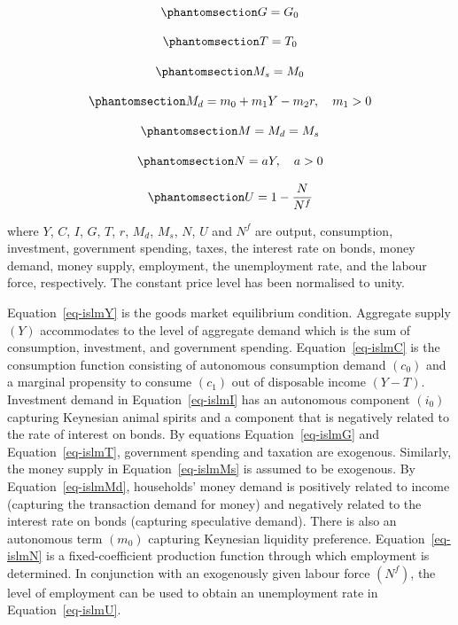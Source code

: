 \documentclass[
  letterpaper,
  DIV=11,
  numbers=noendperiod]{scrreprt}
\begin{document}
\begin{equation}\phantomsection\label{eq-islmG}{
G=G_{0}
}\end{equation}

\begin{equation}\phantomsection\label{eq-islmT}{
T=T_{0}
}\end{equation}

\begin{equation}\phantomsection\label{eq-islmMs}{
M_{s}=M_{0}
}\end{equation}

\begin{equation}\phantomsection\label{eq-islmMd}{
M_{d}=m_{0}+m_{1} Y-m_{2} r, \quad m_{1}>0
}\end{equation}

\begin{equation}\phantomsection\label{eq-islmM}{
M=M_{d}=M_{s}
}\end{equation}

\begin{equation}\phantomsection\label{eq-islmN}{
N=a Y, \quad a>0
}\end{equation}

\begin{equation}\phantomsection\label{eq-islmU}{
U=1-\frac{N}{N^{f}}
}\end{equation}

where \(Y\), \(C\), \(I\), \(G\), \(T\), \(r\), \(M_{d}\), \(M_{s}\),
\(N\), \(U\) and \(N^{f}\) are output, consumption, investment,
government spending, taxes, the interest rate on bonds, money demand,
money supply, employment, the unemployment rate, and the labour force,
respectively. The constant price level has been normalised to unity.

Equation~\ref{eq-islmY} is the goods market equilibrium condition.
Aggregate supply \((Y)\) accommodates to the level of aggregate demand
which is the sum of consumption, investment, and government spending.
Equation~\ref{eq-islmC} is the consumption function consisting of
autonomous consumption demand \(\left(c_{0}\right)\) and a marginal
propensity to consume \(\left(c_{1}\right)\) out of disposable income
\((Y-T)\). Investment demand in Equation~\ref{eq-islmI} has an
autonomous component \(\left(i_{0}\right)\) capturing Keynesian animal
spirits and a component that is negatively related to the rate of
interest on bonds. By equations Equation~\ref{eq-islmG} and
Equation~\ref{eq-islmT}, government spending and taxation are exogenous.
Similarly, the money supply in Equation~\ref{eq-islmMs} is assumed to be
exogenous. By Equation~\ref{eq-islmMd}, households' money demand is
positively related to income (capturing the transaction demand for
money) and negatively related to the interest rate on bonds (capturing
speculative demand). There is also an autonomous term
\(\left(m_{0}\right)\) capturing Keynesian liquidity preference.
Equation~\ref{eq-islmN} is a fixed-coefficient production function
through which employment is determined. In conjunction with an
exogenously given labour force \(\left(N^{f}\right)\), the level of
employment can be used to obtain an unemployment rate in
Equation~\ref{eq-islmU}.
\end{document}
